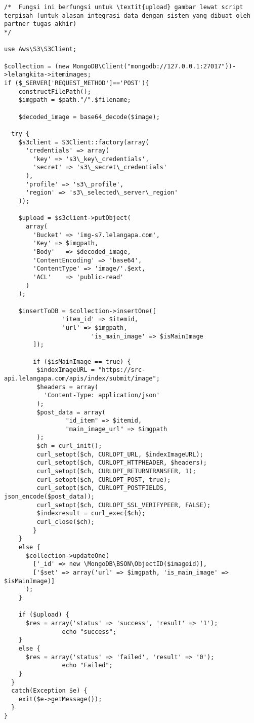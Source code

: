 \begin{lstlisting}[label=cdaws.03-02,style=php,caption=Kode Sumber \textit{Back-end} Upload Gambar Barang]
/*	Fungsi ini berfungsi untuk \textit{upload} gambar lewat script terpisah (untuk alasan integrasi data dengan sistem yang dibuat oleh partner tugas akhir)
*/

use Aws\S3\S3Client;

$collection = (new MongoDB\Client("mongodb://127.0.0.1:27017"))->lelangkita->itemimages;
if ($_SERVER['REQUEST_METHOD']=='POST'){
	constructFilePath();	
	$imgpath = $path."/".$filename;

	$decoded_image = base64_decode($image);

  try {
    $s3client = S3Client::factory(array(
      'credentials' => array(
        'key' => 's3\_key\_credentials',
        'secret' => 's3\_secret\_credentials'
      ),
      'profile' => 's3\_profile',
      'region' => 's3\_selected\_server\_region'
    ));

    $upload = $s3client->putObject(
      array(
        'Bucket' => 'img-s7.lelangapa.com',
        'Key' => $imgpath,
        'Body'   => $decoded_image,
        'ContentEncoding' => 'base64',
        'ContentType' => 'image/'.$ext,
        'ACL'    => 'public-read'
      )
    );

    $insertToDB = $collection->insertOne([
                'item_id' => $itemid,
                'url' => $imgpath,
                        'is_main_image' => $isMainImage
        ]);

        if ($isMainImage == true) {
         $indexImageURL = "https://src-api.lelangapa.com/apis/index/submit/image";
         $headers = array(
           'Content-Type: application/json'
         );
         $post_data = array(
                 "id_item" => $itemid,
                 "main_image_url" => $imgpath
         );
         $ch = curl_init();
         curl_setopt($ch, CURLOPT_URL, $indexImageURL);
         curl_setopt($ch, CURLOPT_HTTPHEADER, $headers);
         curl_setopt($ch, CURLOPT_RETURNTRANSFER, 1);
         curl_setopt($ch, CURLOPT_POST, true);
         curl_setopt($ch, CURLOPT_POSTFIELDS, json_encode($post_data));
         curl_setopt($ch, CURLOPT_SSL_VERIFYPEER, FALSE);
         $indexresult = curl_exec($ch);
         curl_close($ch);
        }
    }
    else {
      $collection->updateOne(
        ['_id' => new \MongoDB\BSON\ObjectID($imageid)],
        ['$set' => array('url' => $imgpath, 'is_main_image' => $isMainImage)]
      );
    }

    if ($upload) {
      $res = array('status' => 'success', 'result' => '1');
                echo "success";
    }
    else {
      $res = array('status' => 'failed', 'result' => '0');
                echo "Failed";
    }
  }
  catch(Exception $e) {
    exit($e->getMessage());
  }
}


\end{lstlisting}
